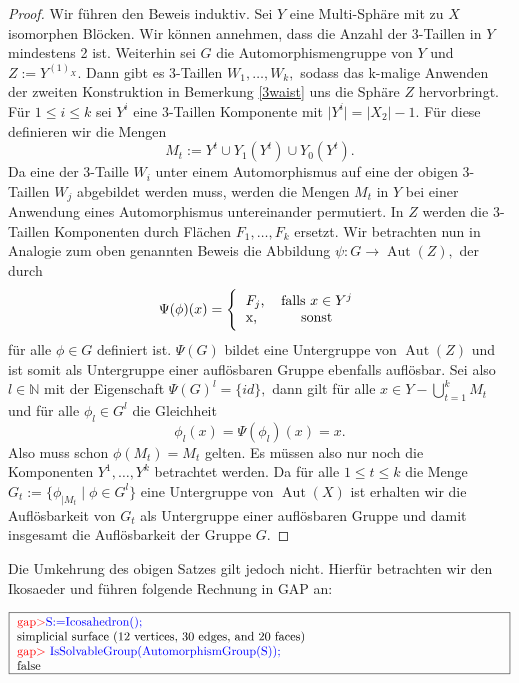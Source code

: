 \documentclass[12pt,titlepage,twoside,cleardoublepage]{article}
\theoremstyle{nummermitklammern}
\numberwithin{equation}{section}
\DeclareMathOperator{\Aut}{Aut}
\begin{document}
\begin{proof}
Wir führen den Beweis induktiv. Sei $Y$ eine Multi-Sphäre mit zu $X$ isomorphen Blöcken. Wir können annehmen, dass die Anzahl der 3-Taillen in $Y$ mindestens 2 ist. Weiterhin sei $G$ die Automorphismengruppe von $Y$ und $Z:=Y^{(1)_X}.$ Dann gibt es 3-Taillen $W_1,\ldots,W_k,$ sodass das k-malige Anwenden der zweiten Konstruktion in Bemerkung \ref{3waist} uns die Sphäre $Z$ hervorbringt.
 Für $1\leq i \leq k$ sei $Y^i$ eine 3-Taillen Komponente mit $\vert Y^i\vert =\vert X_2\vert -1.$ Für diese definieren wir die Mengen 
\[
M_t:=Y^t\cup Y_1(Y^t)\cup Y_0(Y^t).
\] Da eine der 3-Taille $W_i$ unter einem Automorphismus auf eine der obigen 3-Taillen $W_j$ abgebildet werden muss, werden die Mengen $M_t$ in $Y$ bei einer Anwendung eines Automorphismus untereinander permutiert. In $Z$ werden die 3-Taillen Komponenten durch Flächen $F_1,\ldots,F_k$ ersetzt.
Wir betrachten nun in Analogie zum oben genannten Beweis die Abbildung $\psi:G\to \Aut(Z),$ der durch
\[
\Psi(\phi)(x)=\Biggl\{
\begin{tabular}[l]{lcr}
$F_j$,&\textcolor{black}{ falls  $x\in Y^j$} \\
x,& sonst\\
\end{tabular}
\]
für alle $\phi\in G$ definiert ist.
$\Psi(G)$ bildet eine Untergruppe von $\Aut(Z)$ und ist somit als Untergruppe einer auflösbaren Gruppe ebenfalls auflösbar. Sei also $l\in \mathbb{N}$ mit der Eigenschaft $\Psi(G)^l=\{id\},$ dann gilt für alle $x\in Y-\bigcup_{t=1}^kM_t$ und für alle $\phi_l \in G^l$ die Gleichheit
\[
\phi_l(x)=\Psi(\phi_l)(x)=x.
\]
Also muss schon $\phi(M_t)=M_t$ gelten. Es müssen also nur noch die Komponenten $Y^1,\ldots,Y^k$ betrachtet werden. Da für alle $1\leq t\leq k$ die Menge $G_t:=\{\phi_{\mid M_t}\mid \phi\in G^l\}$ eine Untergruppe von $\Aut(X)$ ist erhalten wir die Auflösbarkeit von $G_t$ als Untergruppe einer auflösbaren Gruppe und damit insgesamt die Auflösbarkeit der Gruppe $G.$
 \end{proof}
Die Umkehrung des obigen Satzes gilt jedoch nicht. Hierfür betrachten wir den Ikosaeder und führen folgende Rechnung in GAP an:
\begin{center}
$\fbox{
\parbox{14cm}{
\textcolor{red}{gap$>$}\textcolor{blue}{ S:=Icosahedron();}\newline
simplicial surface (12 vertices, 30 edges, and 20 faces)\newline
\textcolor{red}{gap$>$} \textcolor{blue}{IsSolvableGroup(AutomorphismGroup(S));}\newline
false
}}$
\end{center}
\end{document}
